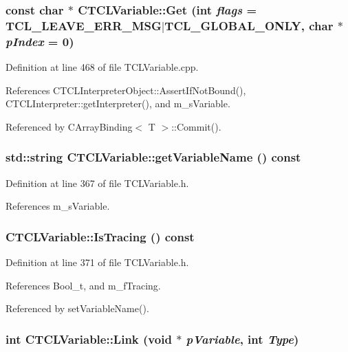 \subsubsection{\setlength{\rightskip}{0pt plus 5cm}const char $\ast$ CTCLVariable::Get (int {\em flags} = TCL\_\-LEAVE\_\-ERR\_\-MSG$|$TCL\_\-GLOBAL\_\-ONLY, char $\ast$ {\em p\-Index} = 0)\hspace{0.3cm}{\tt  [virtual]}}\label{classCTCLVariable_a12}




Definition at line 468 of file TCLVariable.cpp.

References CTCLInterpreter\-Object::Assert\-If\-Not\-Bound(), CTCLInterpreter::get\-Interpreter(), and m\_\-s\-Variable.

Referenced by CArray\-Binding$<$ T $>$::Commit().
\subsubsection{\setlength{\rightskip}{0pt plus 5cm}std::string CTCLVariable::get\-Variable\-Name () const\hspace{0.3cm}{\tt  [inline]}}\label{classCTCLVariable_a6}




Definition at line 367 of file TCLVariable.h.

References m\_\-s\-Variable.
\subsubsection{ CTCLVariable::Is\-Tracing () const\hspace{0.3cm}{\tt  [inline]}}\label{classCTCLVariable_a7}




Definition at line 371 of file TCLVariable.h.

References Bool\_\-t, and m\_\-f\-Tracing.

Referenced by set\-Variable\-Name().
\subsubsection{\setlength{\rightskip}{0pt plus 5cm}int CTCLVariable::Link (void $\ast$ {\em p\-Variable}, int {\em Type})}\label{classCTCLVariable_a13}




